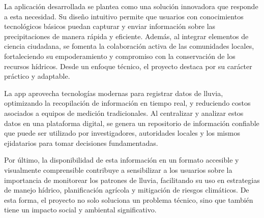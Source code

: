 La aplicación desarrollada se plantea como una solución innovadora que responde a esta necesidad. Su diseño intuitivo permite que usuarios con conocimientos tecnológicos básicos puedan capturar y enviar información sobre las precipitaciones de manera rápida y eficiente. Además, al integrar elementos de ciencia ciudadana, se fomenta la colaboración activa de las comunidades locales, fortaleciendo su empoderamiento y compromiso con la conservación de los recursos hídricos. Desde un enfoque técnico, el proyecto destaca por su carácter práctico y adaptable.

La app aprovecha tecnologías modernas para registrar datos de lluvia, optimizando la recopilación de información en tiempo real, y reduciendo costos asociados a equipos de medición tradicionales. Al centralizar y analizar estos datos en una plataforma digital, se genera un repositorio de información confiable que puede ser utilizado por investigadores, autoridades locales y los mismos ejidatarios para tomar
decisiones fundamentadas.

Por último, la disponibilidad de esta información en un formato accesible y visualmente comprensible contribuye a sensibilizar a los usuarios sobre la importancia de monitorear los patrones de lluvia, facilitando su uso en estrategias de manejo hídrico, planificación agrícola y mitigación de riesgos climáticos. De esta forma, el proyecto no solo soluciona un problema técnico, sino que también tiene un
impacto social y ambiental significativo.







